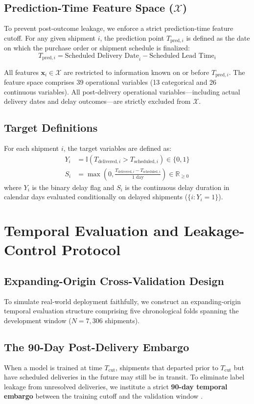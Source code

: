 \documentclass[11pt,a4paper]{article}
\begin{document}
\subsection{Prediction-Time Feature Space ($\mathcal{X}$)}
To prevent post-outcome leakage, we enforce a strict prediction-time feature cutoff. For any given shipment $i$, the prediction point $T_{\text{pred}, i}$ is defined as the date on which the purchase order or shipment schedule is finalized:
\begin{equation}
T_{\text{pred}, i} = \text{Scheduled Delivery Date}_i - \text{Scheduled Lead Time}_i
\end{equation}

All features $\mathbf{x}_i \in \mathcal{X}$ are restricted to information known on or before $T_{\text{pred}, i}$. The feature space comprises 39 operational variables (13 categorical and 26 continuous variables). All post-delivery operational variables---including actual delivery dates and delay outcomes---are strictly excluded from $\mathcal{X}$.

\subsection{Target Definitions}
For each shipment $i$, the target variables are defined as:
\begin{align}
Y_i &= \mathbb{I}\left(T_{\text{delivered}, i} > T_{\text{scheduled}, i}\right) \in \{0, 1\} \\
S_i &= \max\left(0, \frac{T_{\text{delivered}, i} - T_{\text{scheduled}, i}}{1\text{ day}}\right) \in \mathbb{R}_{\ge 0}
\end{align}
where $Y_i$ is the binary delay flag and $S_i$ is the continuous delay duration in calendar days evaluated conditionally on delayed shipments ($\{i : Y_i = 1\}$).

\section{Temporal Evaluation and Leakage-Control Protocol}
\subsection{Expanding-Origin Cross-Validation Design}
To simulate real-world deployment faithfully, we construct an expanding-origin temporal evaluation structure comprising five chronological folds spanning the development window ($N = 7,306$ shipments).

\subsection{The 90-Day Post-Delivery Embargo}
When a model is trained at time $T_{\text{cut}}$, shipments that departed prior to $T_{\text{cut}}$ but have scheduled deliveries in the future may still be in transit. To eliminate label leakage from unresolved deliveries, we institute a strict \textbf{90-day temporal embargo} between the training cutoff and the validation window \cite{deprado2018advances}.
\end{document}
